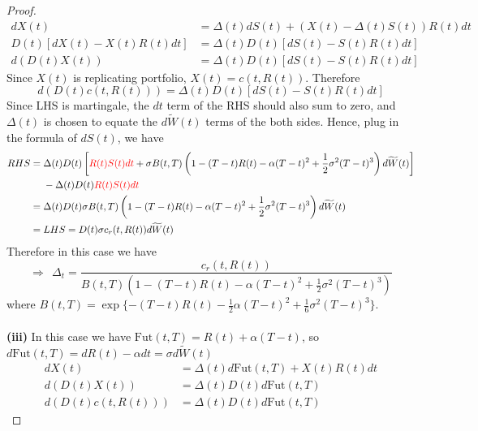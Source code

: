 \documentclass[a4paper, 10pt]{article}
\theoremstyle{definition}
\theoremstyle{hSol}
\begin{document}
\begin{proof}
\begin{equation}
\begin{split}
    dX(t) &= \Delta(t)dS(t) + (X(t) - \Delta(t)S(t))R(t)dt \\
    D(t)[dX(t) - X(t)R(t)dt]& = \Delta(t)D(t)[dS(t) - S(t)R(t)dt] \\
    d(D(t)X(t)) &= \Delta(t)D(t)[dS(t) - S(t)R(t)dt]
  \end{split}
\end{equation}
Since $X(t)$ is replicating portfolio, $X(t)=c(t,R(t))$. Therefore
\begin{equation}
  d(D(t)c(t,R(t))) = \Delta(t)D(t)[dS(t) - S(t)R(t)dt]
\end{equation}
Since LHS is martingale, the $dt$ term of the RHS should also sum to zero, and $\Delta(t)$ is chosen to equate the $d\widetilde{W}(t)$ terms of the both sides. Hence, plug in the formula of $dS(t)$, we have
\begin{equation}
  \begin{split}
    RHS &= \Delta(t)D(t) \left[\textcolor{red}{R(t)S(t)dt} + \sigma B(t,T)\left(1-(T-t)R(t) -\alpha (T-t)^2 + \frac{1}{2}\sigma^2(T-t)^3\right)d\widetilde{W}(t)\right]\\
    &~~~~-\Delta(t)D(t)\textcolor{red}{R(t)S(t)dt}\\
    &=\Delta(t)D(t)\sigma B(t,T)\left(1-(T-t)R(t) -\alpha (T-t)^2 + \frac{1}{2}\sigma^2(T-t)^3\right)d\widetilde{W}(t) \\
    &=LHS = D(t)\sigma c_r(t,R(t)) d\widetilde{W}(t)
  \end{split}
\end{equation}
Therefore in this case we have
\begin{equation}
  \Rightarrow~~\Delta_t = \frac{c_r(t,R(t))}{B(t,T)\left(1-(T-t)R(t) -\alpha (T-t)^2 + \frac{1}{2}\sigma^2(T-t)^3\right)}
\end{equation}
where $B(t,T)=\exp\{-(T-t)R(t)-\frac{1}{2}\alpha(T-t)^2+\frac{1}{6}\sigma^2(T-t)^3\}$.\\
~\\
\textbf{(iii)} In this case we have $\text{Fut}(t,T) = R(t)+\alpha(T-t)$, so $d\text{Fut}(t,T) = dR(t)-\alpha dt = \sigma d\widetilde{W}(t)$
\begin{equation}
  \begin{split}
    dX(t) &= \Delta(t)d\text{Fut}(t,T) + X(t)R(t)dt\\
     d(D(t)X(t)) &= \Delta(t)D(t)d\text{Fut}(t,T)\\
     d(D(t)c(t,R(t))) &= \Delta(t)D(t)d\text{Fut}(t,T)
  \end{split}
\end{equation}
\begin{equation}

\end{equation}
\end{proof}
\end{document}
